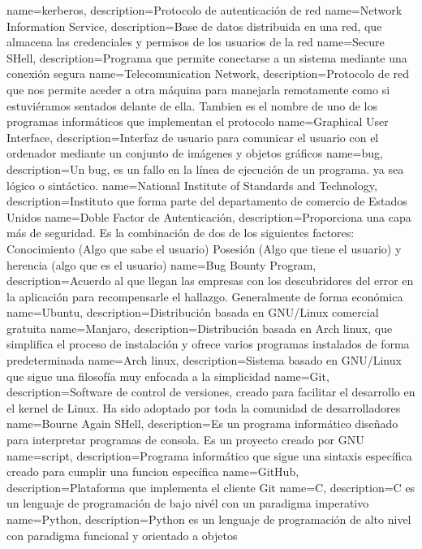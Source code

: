 {
	name=kerberos,
	description={Protocolo de autenticación de red}
}
{
	name=Network Information Service,
	description={Base de datos distribuida en una red, que almacena las credenciales y permisos de los usuarios de la red}
}
{
	name=Secure SHell,
	description={Programa que permite conectarse a un sistema mediante una conexión segura}
}
{
	name=Telecomunication Network,
	description={Protocolo de red que nos permite aceder a otra máquina para manejarla remotamente como si estuviéramos sentados delante de ella. Tambien es el nombre de uno de los programas informáticos que implementan el protocolo}
}
{
	name=Graphical User Interface,
	description={Interfaz de usuario para comunicar el usuario con el ordenador mediante un conjunto de imágenes y objetos gráficos}
}
{
	name=bug,
	description={Un bug, es un fallo en la línea de ejecución de un programa. ya sea lógico o sintáctico.}
}
{
	name=National Institute of Standards and Technology,
	description={Instituto que forma parte del departamento de comercio de Estados Unidos}
}
{
	name=Doble Factor de Autenticación,
	description={Proporciona una capa más de seguridad. Es la combinación de dos de los siguientes factores: Conocimiento (Algo que sabe el usuario) Posesión (Algo que tiene el usuario) y herencia (algo que es el usuario)}
}
{
	name=Bug Bounty Program,
	description={Acuerdo al que llegan las empresas con los descubridores del error en la aplicación para recompensarle el hallazgo. Generalmente de forma económica}
}
{
	name=Ubuntu,
	description={Distribución basada en GNU/Linux comercial gratuita}
}
{
	name=Manjaro,
	description={Distribución basada en Arch linux, que simplifica el proceso de instalación y ofrece varios programas instalados de forma predeterminada}
}
{
	name=Arch linux,
	description={Sistema basado en GNU/Linux que sigue una filosofía muy enfocada a la simplicidad}
}
{
	name=Git,
	description={Software de control de versiones, creado para facilitar el desarrollo en el kernel de Linux. Ha sido adoptado por toda la comunidad de desarrolladores}
}
{
	name=Bourne Again SHell,
	description={Es un programa informático diseñado para interpretar programas de consola. Es un proyecto creado por GNU}
}
{
	name=script,
	description={Programa informático que sigue una sintaxis específica creado para cumplir una funcion específica}
}
{
	name=GitHub,
	description={Plataforma que implementa el cliente Git}
}
{
	name=C,
	description={C es un lenguaje de programación de bajo nivél con un paradigma imperativo}
}
{
	name=Python,
	description={Python es un lenguaje de programación de alto nivel con paradigma funcional y orientado a objetos}
}
